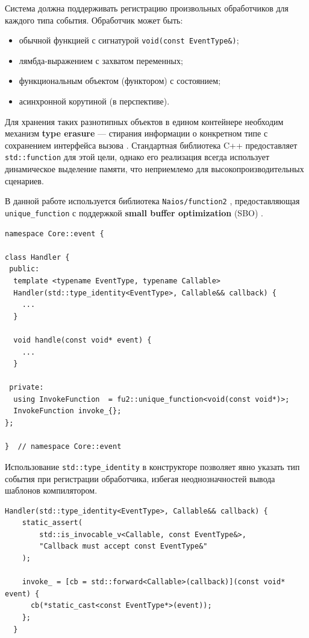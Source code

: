 Система должна поддерживать регистрацию произвольных обработчиков для каждого типа события. Обработчик может быть:
\begin{itemize}
    \item обычной функцией с сигнатурой \texttt{void(const EventType\&)};
    \item лямбда-выражением с захватом переменных;
    \item функциональным объектом (функтором) с состоянием;
    \item асинхронной корутиной (в перспективе).
\end{itemize}

Для хранения таких разнотипных объектов в едином контейнере необходим механизм \textbf{type erasure} --- стирания информации о конкретном типе с сохранением интерфейса вызова \cite{alexandrescu2001modern}.
Стандартная библиотека C++ предоставляет \texttt{std::function} для этой цели, однако его реализация всегда использует динамическое выделение памяти, что неприемлемо для высокопроизводительных сценариев.

В данной работе используется библиотека \texttt{Naios/function2}  \cite{function2lib}, предоставляющая \texttt{unique\_function} с поддержкой \textbf{small buffer optimization} (SBO) \cite{parent2013inheritance}.

\begin{lstlisting}[caption={Handler с type erasure},label=lst:handler_impl]
namespace Core::event {

class Handler {
 public:
  template <typename EventType, typename Callable>
  Handler(std::type_identity<EventType>, Callable&& callback) {
    ...
  }

  void handle(const void* event) {
    ...
  }

 private:
  using InvokeFunction  = fu2::unique_function<void(const void*)>;
  InvokeFunction invoke_{};
};

}  // namespace Core::event
\end{lstlisting}

Использование \texttt{std::type\_identity} в конструкторе позволяет явно указать тип события при регистрации обработчика, избегая неоднозначностей вывода шаблонов компилятором.

\begin{lstlisting}[caption={Шаблонный конструктор для Handler},label=lst:handler_impl]
  Handler(std::type_identity<EventType>, Callable&& callback) {
    static_assert(
        std::is_invocable_v<Callable, const EventType&>,
        "Callback must accept const EventType&"
    );

    invoke_ = [cb = std::forward<Callable>(callback)](const void* event) {
      cb(*static_cast<const EventType*>(event));
    };
  }
\end{lstlisting}

